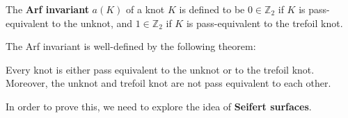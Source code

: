 \documentclass{article}
\begin{document}
{\begin{definition}[] The \textbf{Arf invariant} $a(K)$ of a knot $K$  is defined to be $0\in \mathbb{Z}_2$ if $K$ is pass-equivalent to the unknot, and $1\in \mathbb{Z}_2$ if $K$ is pass-equivalent to the trefoil knot. 
\end{definition}

The Arf invariant is well-defined by the following theorem:

\begin{theorem}Every knot is either pass equivalent to the unknot or to the trefoil knot. Moreover, the unknot and trefoil knot are not pass equivalent to each other.\\
\end{theorem} %

In order to prove this, we need to explore the idea of \textbf{Seifert surfaces}.


}
\end{document}
